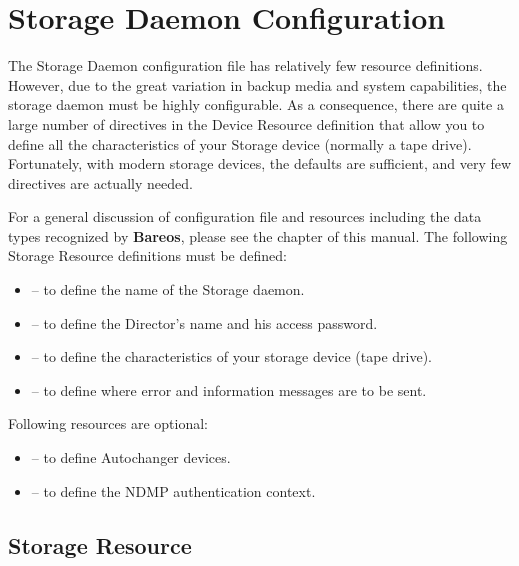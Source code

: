
\chapter{Storage Daemon Configuration}
\label{StoredConfChapter}

The Storage Daemon configuration file has relatively few resource definitions.
However, due to the great variation in backup media and system capabilities,
the storage daemon must be highly configurable. As a consequence, there are
quite a large number of directives in the Device Resource definition that
allow you to define all the characteristics of your Storage device (normally a
tape drive). Fortunately, with modern storage devices, the defaults are
sufficient, and very few directives are actually needed.

For a general discussion of configuration file and resources including the
data types recognized by {\bf Bareos}, please see the
 chapter of this manual. The
following Storage Resource definitions must be defined:

\begin{itemize}
\item
    -- to define the  name of the
   Storage daemon.
\item
    -- to  define the Director's
   name and his access password.
\item
    -- to define  the
   characteristics of your storage device (tape  drive).
\item
    -- to define where error  and
   information messages are to be sent.
\end{itemize}

Following resources are optional:
\begin{itemize}
\item
    -- to define Autochanger devices.
\item
    -- to define the NDMP authentication
   context.
\end{itemize}

\section{Storage Resource}
\label{StorageResource}

